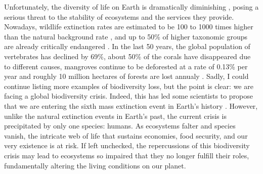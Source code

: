 Unfortunately, the diversity of life on Earth is dramatically diminishing
\cite{Hughes1997,Ceballos2002,Pereira2010}, posing a serious threat to the
stability of ecosystems and the services they provide. Nowadays, wildlife
extinction rates are estimated to be 100 to 1000 times higher than the natural
background rate \cite{Ceballos2015,Pimm2014}, and up to 50\% of higher
taxonomic groups are already critically endangered \cite{Smith2009}. In the
last 50 years, the global population of vertebrates has declined by 69\%, about
50\% of the corals have disappeared due to different causes, mangroves
continue to be deforested at a rate of 0.13\% per year and roughly 10 million
hectares of forests are lost annualy \cite{WWF2022}. Sadly, I could continue
listing more examples of biodiversity loss, but the point is clear: we are
facing a global biodiversity crisis. Indeed, this has led some scientists to
propose that we are entering the sixth mass extinction event in Earth's history
\cite{Barnosky2011}. However, unlike the natural extinction events in Earth’s
past, the current crisis is precipitated by only one species: humans. As
ecosystems falter and species vanish, the intricate web of life that sustains
economies, food security, and our very existence is at risk. If left unchecked,
the repercussions of this biodiversity crisis may lead to ecosystems so
impaired that they no longer fulfill their roles, fundamentally altering the
living conditions on our planet.

